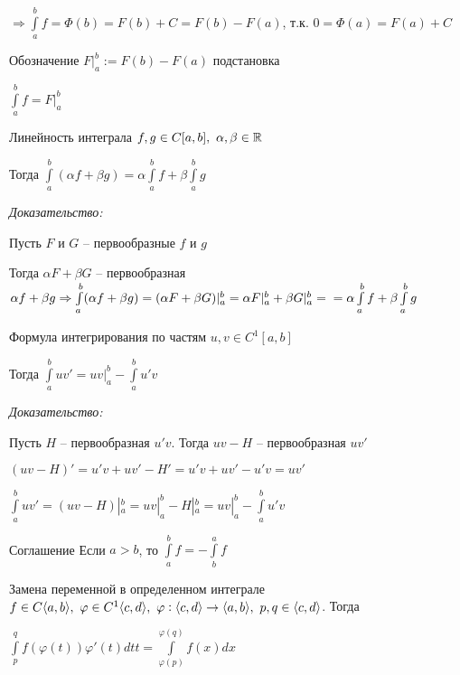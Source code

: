 \documentclass[12pt]{article}
\begin{document}
$\Rightarrow \int\limits_a^b f = \Phi(b) = F(b) + C = F(b) - F(a)$, т.к. $0 = \Phi(a) = F(a) + C$

\begin{nota}{Обозначение}
    $F|_a^b := F(b) - F(a)$ подстановка

    $\int\limits_a^b f = F|_a^b$
\end{nota}

\begin{theo}{Линейность интеграла}
    $f, g \in C[a, b],\ \alpha, \beta \in \mathbb R$

    Тогда $\int\limits_a^b (\alpha f + \beta g) = \alpha \int\limits_a^b f + \beta \int\limits_a^b g$
\end{theo}

\textit{Доказательство:}

Пусть $F$ и $G$ -- первообразные $f$ и $g$

Тогда $\alpha F + \beta G$ -- первообразная $\alpha f + \beta g \Rightarrow \int\limits_a^b (\alpha f + \beta g) = (\alpha F + \beta G)|_a^b = \alpha F|_a^b + \beta G|_a^b = \\
= \alpha \int\limits_a^b f + \beta \int\limits_a^b g$

\begin{theo}{Формула интегрирования по частям}
    $u, v \in C^1[a, b]$

    Тогда $\int\limits_a^b uv' = uv|_a^b - \int\limits_a^b u'v$
\end{theo}

\textit{Доказательство:}

Пусть $H$ -- первообразная $u'v$. Тогда $uv - H$ -- первообразная $uv'$

$(uv - H)' = u'v + uv' - H' = u'v + uv' - u'v = uv'$

$\int\limits_a^b uv' = (uv - H)|_a^b = uv|_a^b - H|_a^b = uv|_a^b - \int\limits_a^b u'v$

\begin{nota}{Соглашение}
    Если $a > b$, то $\int\limits_a^b f = -\int\limits_b^a f$
\end{nota}

\begin{theo}{Замена переменной в определенном интеграле}
    $f \in C\langle a, b \rangle,\ \varphi \in C^1\langle c, d \rangle,\ \varphi : \langle c, d \rangle \rightarrow \langle a, b \rangle,\ p, q \in \langle c, d \rangle$. Тогда

    $\int\limits_p^q f(\varphi(t))\varphi'(t)dtt = \int\limits_{\varphi(p)}^{\varphi(q)} f(x)dx$
\end{theo}
\end{document}
